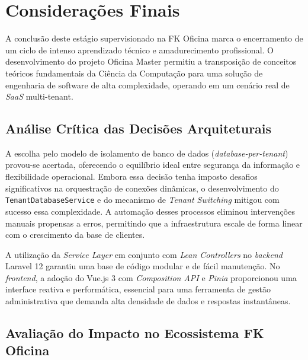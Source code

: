 
\chapter{Considerações Finais}
\label{cap:conclusao}

A conclusão deste estágio supervisionado na FK Oficina marca o encerramento de um ciclo de intenso aprendizado técnico e amadurecimento profissional. O desenvolvimento do projeto Oficina Master permitiu a transposição de conceitos teóricos fundamentais da Ciência da Computação para uma solução de engenharia de software de alta complexidade, operando em um cenário real de \textit{SaaS} multi-tenant.

\section{Análise Crítica das Decisões Arquiteturais}

A escolha pelo modelo de isolamento de banco de dados (\textit{database-per-tenant}) provou-se acertada, oferecendo o equilíbrio ideal entre segurança da informação e flexibilidade operacional. Embora essa decisão tenha imposto desafios significativos na orquestração de conexões dinâmicas, o desenvolvimento do \texttt{TenantDatabaseService} e do mecanismo de \textit{Tenant Switching} mitigou com sucesso essa complexidade. A automação desses processos eliminou intervenções manuais propensas a erros, permitindo que a infraestrutura escale de forma linear com o crescimento da base de clientes.

A utilização da \textit{Service Layer} em conjunto com \textit{Lean Controllers} no \textit{backend} Laravel 12 garantiu uma base de código modular e de fácil manutenção. No \textit{frontend}, a adoção do Vue.js 3 com \textit{Composition API} e \textit{Pinia} proporcionou uma interface reativa e performática, essencial para uma ferramenta de gestão administrativa que demanda alta densidade de dados e respostas instantâneas.

\section{Avaliação do Impacto no Ecossistema FK Oficina}

